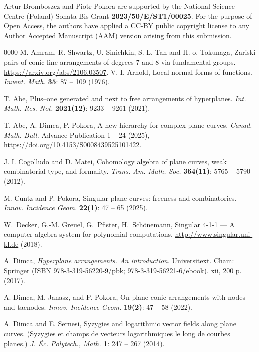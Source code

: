 \documentclass[11pt]{article}
\theoremstyle{plain}
\theoremstyle{definition}
\begin{document}
Artur Bromboszcz and Piotr Pokora are supported by the National Science Centre (Poland) Sonata Bis Grant  \textbf{2023/50/E/ST1/00025}. For the purpose of Open Access, the authors have applied a CC-BY public copyright license to any Author Accepted Manuscript (AAM) version arising from this submission.

\begin{thebibliography}{0000}
M. Amram, R. Shwartz, U. Sinichkin, S.-L. Tan and H.-o. Tokunaga, Zariski pairs of conic-line arrangements of degrees 7 and 8 via fundamental groups. \url{https://arxiv.org/abs/2106.03507}.
V. I. Arnold, Local normal forms of functions. \textit{Invent. Math.} \textbf{35}: 87 -- 109 (1976).

  T. Abe, Plus--one generated and next to free arrangements of hyperplanes. \textit{Int. Math. Res. Not.} \textbf{2021(12)}: 9233 -- 9261 (2021).

T. Abe, A. Dimca, P. Pokora, A new hierarchy for complex plane curves. \textit{Canad. Math. Bull.} Advance Publication 1 -- 24 (2025), \url{https://doi.org/10.4153/S0008439525101422}.

J. I. Cogolludo and D. Matei, Cohomology algebra of plane curves, weak combinatorial type, and formality. \textit{Trans. Am. Math. Soc.} \textbf{364(11)}: 5765 -- 5790 (2012).

M. Cuntz and P. Pokora, Singular plane curves: freeness and combinatorics. \textit{Innov. Incidence Geom.} \textbf{22(1)}: 47 -- 65 (2025).

 W.~Decker, G.-M. Greuel, G.~Pfister, H.~Sch\"onemann, Singular {4-1-1} --- {A} computer algebra system for polynomial computations, \url{http://www.singular.uni-kl.de} (2018).

A. Dimca,  \textit{Hyperplane arrangements. An introduction}. Universitext. Cham: Springer (ISBN 978-3-319-56220-9/pbk; 978-3-319-56221-6/ebook). xii, 200 p. (2017).

A. Dimca, M. Janasz, and P. Pokora, On plane conic arrangements with nodes and tacnodes. \textit{Innov. Incidence Geom.} \textbf{19(2)}: 47 -- 58 (2022).

A. Dimca and E. Sernesi, Syzygies and logarithmic vector fields along plane curves. (Syzygies et champs de vecteurs logarithmiques le long de courbes planes.) \textit{J. Éc. Polytech., Math.} \textbf{1}: 247 -- 267 (2014).


\end{thebibliography}
\end{document}
